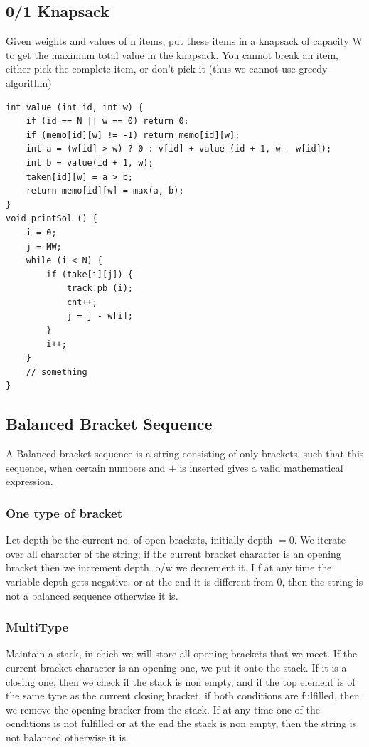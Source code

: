 \documentclass[8pt, a4paper, oneside, twocolumn]{extarticle}
\begin{document}
\subsection{0/1 Knapsack}
Given weights and values of n items, put these items in a knapsack of capacity W to get the maximum total value in the knapsack. You cannot break an item, either pick the complete item, or don’t pick it (thus we cannot use greedy algorithm)
\begin{verbatim}
int value (int id, int w) {
    if (id == N || w == 0) return 0;
    if (memo[id][w] != -1) return memo[id][w];
    int a = (w[id] > w) ? 0 : v[id] + value (id + 1, w - w[id]);
    int b = value(id + 1, w);
    taken[id][w] = a > b;
    return memo[id][w] = max(a, b);
}
void printSol () {
    i = 0;
    j = MW;
    while (i < N) {
        if (take[i][j]) {
            track.pb (i);
            cnt++;
            j = j - w[i];
        }
        i++;
    }
    // something
}
\end{verbatim}
\subsection{Balanced Bracket Sequence}
A Balanced bracket sequence is a string consisting of only brackets, such that this sequence, when certain numbers and $+$ is inserted gives a valid mathematical expression.
\subsubsection{One type of bracket}
Let depth be the current no. of open brackets, initially depth $= 0$. We iterate over all character of the string; if the current bracket character is an opening bracket then we increment depth, o/w we decrement it. I f at any time the variable depth gets negative, or at the end it is different from 0, then the string is not a balanced sequence otherwise it is.
\subsubsection{MultiType}
Maintain a stack, in chich we will store all opening brackets that we meet. If the current bracket character is an opening one, we put it onto the stack. If it is a closing one, then we check if the stack is non empty, and if the top element is of the same type as the current closing bracket, if both conditions are fulfilled, then we remove the opening bracker from the stack. If at any time one of the ocnditions is not fulfilled or at the end the stack is non empty, then the string is not balanced otherwise it is.
\end{document}

